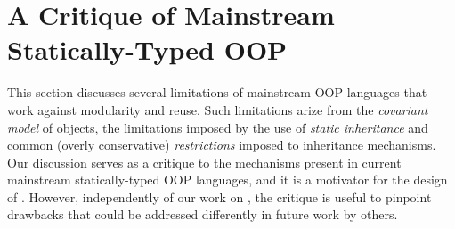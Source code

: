 \section{A Critique of Mainstream Statically-Typed OOP}
\label{sec:critique}

This section discusses several limitations of mainstream OOP languages
that work against modularity and reuse. 
Such limitations arize from the
\emph{covariant model} of objects, the limitations imposed by the use
of \emph{static inheritance} and common (overly conservative) 
\emph{restrictions} imposed to inheritance mechanisms.
Our discussion serves as a critique to the mechanisms present in
current mainstream statically-typed OOP languages, and it is  
a motivator for the design of \name. However, independently of our work on \name, 
the critique is useful to pinpoint drawbacks that could be addressed
differently in future work by others.

\begin{comment}
 In particular we argue that in the
standard model of class-based OOP is grounded on the following 
assumptions:

\begin{itemize}

\item {\bf The covariant view of objects:} 

\item {\bf The view that extensions lead to subtypes:}

\item {\bf }

\end{itemize}

Those points were a driver for the
design of \name, which aims to address all of those limitations. 

\subsection{The Standard Model of Class-Based OOP}

In the standard statically typed OOP model for class-based languages
\emph{extensions} (subclasses or subinterfaces) are viewed as \emph{subtypes} of the original
class/interface. Moreover subclasses inherit from the superclasses,
and inheritance and subtyping always go along together.
This is the model adopted by most popular mainstream
languages, such as Java, C\#, C++ or Scala. This model can be traced
back to the origins of OOP in Simula~\cite{}, and has shown an 
undeniable resiliance through times. One reason why this model remains 
so popular is probably simplicity: 
extensions (of classes or interfaces) always result in subtypes.  
This results in a very simple programming model, which is easy 
to explain to programmers.  

Unfortunatelly, as the theory of OOP languages and subtyping has taught 
us that the story is not quite so simple. Since the early days of the
theoretical foundations of OOP and subtyping, it has bee

Early on Cook et al. argued
that {\bf Inheritance is not Subtyping}. \ldots
\end{comment}


